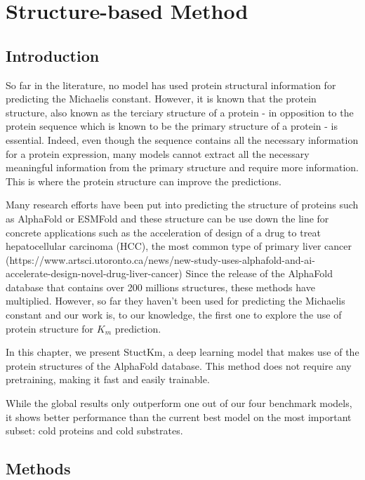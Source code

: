 
\chapter{Structure-based Method}

\section{Introduction}

So far in the literature, no model has used protein structural information for predicting the Michaelis
constant. However, it is known that the protein structure, also known as the terciary structure of a protein - in
opposition to the protein sequence which is known to be the primary structure of a protein - is essential. Indeed,
even though the sequence contains all the necessary information for a protein expression, many models cannot
extract all the necessary meaningful information from the primary structure and require more information. This is
where the protein structure can improve the predictions. 

Many research efforts have been put into predicting the structure of proteins such as AlphaFold or ESMFold and
these structure can be use down the line for concrete applications such as the acceleration of design 
of a drug to treat hepatocellular carcinoma (HCC), the most common type of primary liver cancer (https://www.artsci.utoronto.ca/news/new-study-uses-alphafold-and-ai-accelerate-design-novel-drug-liver-cancer)
Since the release of the AlphaFold database that contains over 200 millions structures, these methods have multiplied.
However, so far they haven't been used for predicting the Michaelis constant and our work is, to our knowledge, 
the first one to explore the use of protein structure for $K_m$ prediction.

In this chapter, we present StuctKm, a deep learning model that makes use of the protein structures of the
AlphaFold database. This method does not require any pretraining, making it fast and easily trainable. 

While the global results only outperform one out of our four benchmark models, it shows better performance 
than the current best model on the most important subset: cold proteins and cold substrates.

\section{Methods}

